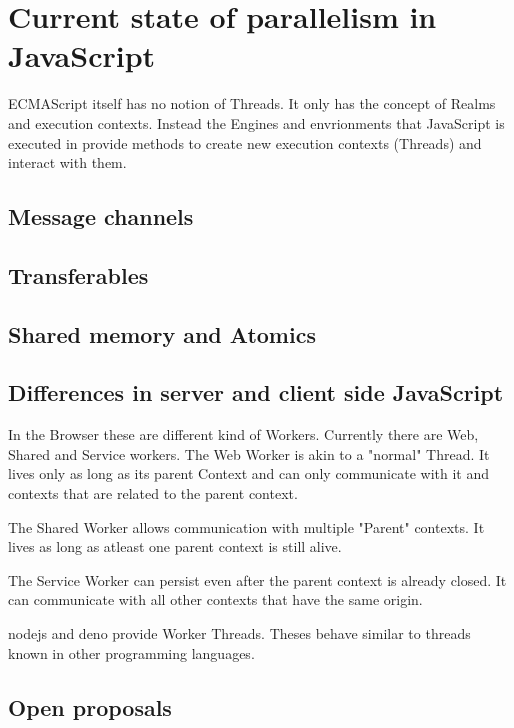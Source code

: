 \clearpage

\chapter{\textbf{Current state of parallelism in JavaScript}}\label{state}
ECMAScript itself has no notion of Threads. It only has the concept of Realms and execution contexts.
Instead the Engines and envrionments that JavaScript is executed in provide methods to create new execution contexts (Threads) and interact with them.


\section{Message channels}\label{cs:messagechannels}

\section{Transferables}

\section{Shared memory and Atomics}

\section{Differences in server and client side JavaScript}

In the Browser these are different kind of Workers.
Currently there are Web, Shared and Service workers.
The Web Worker is akin to a "normal" Thread. It lives only as long as its parent Context and can only communicate with it and contexts that are related to the parent context.

The Shared Worker allows communication with multiple "Parent" contexts. It lives as long as atleast one parent context is still alive.

The Service Worker can persist even after the parent context is already closed. It can communicate with all other contexts that have the same origin.

nodejs and deno provide Worker Threads. Theses behave similar to threads known in other programming languages.

\section{Open proposals}



